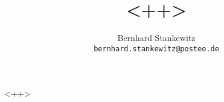 \documentclass[a4paper,11pt]{article} %
\numberwithin{equation}{section}
\theoremstyle{ndefinition}
\theoremstyle{nremark}
\theoremstyle{nplain}
\begin{document}
\title{<++>}
\author{Bernhard Stankewitz \\ \texttt{bernhard.stankewitz@posteo.de}}
\maketitle
\abstract{<++>}
\tableofcontents

<++>


% 
% 
\end{document}
